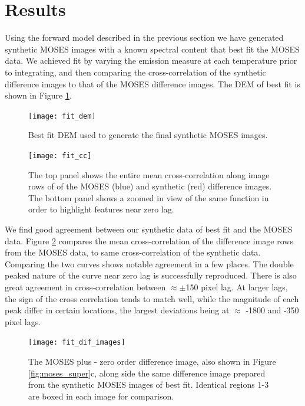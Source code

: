 	

\section{Results}\label{sec:results}
	Using the forward model described in the previous section we have generated synthetic MOSES images with a known spectral content that best fit the MOSES data.
	We achieved fit by varying the emission measure at each temperature prior to integrating, and then comparing the cross-correlation of the synthetic difference images to that of the MOSES difference images.
	The DEM of best fit is shown in Figure \ref{fig:dem}.
	
	\begin{figure}
		\centering
		\texttt{[image: fit\_dem]}
		\caption{Best fit DEM used to generate the final synthetic MOSES images.}
		\label{fig:dem}
	\end{figure}

	\begin{figure}
		\centering
		\texttt{[image: fit\_cc]}
		\caption{The top panel shows the entire mean cross-correlation along image rows of of the MOSES (blue) and synthetic (red) difference images.  The bottom panel shows a zoomed in view of the same function in order to highlight features near zero lag.}
		\label{fig:fit_cc}
	\end{figure}
	
	We find good agreement between our synthetic data of best fit and the MOSES data.
	Figure \ref{fig:fit_cc} compares the mean cross-correlation of the difference image rows from the MOSES data, to same cross-correlation of the synthetic data.
	Comparing the two curves shows notable agreement in a few places.
	The double peaked nature of the curve near zero lag is successfully reproduced.
	There is also great agreement in cross-correlation between $\approx\pm$150 pixel lag.
	At larger lags, the sign of the cross correlation tends to match well, while the magnitude of each peak differ in certain locations, the largest deviations being at $\approx$ -1800 and -350 pixel lags.
	
	\begin{figure}
		\centering
		\texttt{[image: fit\_dif\_images]}
		\caption{The MOSES plus - zero order difference image, also shown in Figure \ref{fig:moses_super}c, along side the same difference image prepared from the synthetic MOSES images of best fit.  Identical regions 1-3 are boxed in each image for comparison. }
		\label{fig:dif_image_fit}
		
	\end{figure}
	
